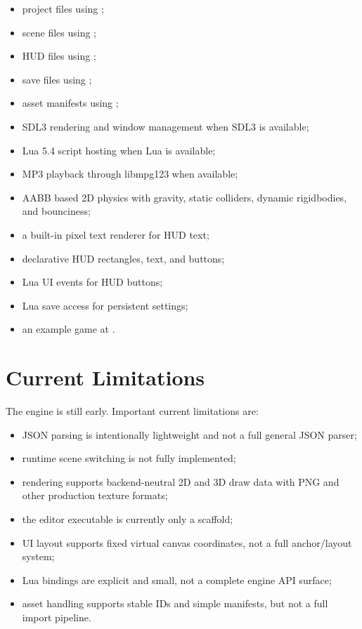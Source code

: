 \begin{itemize}
  \item project files using ;
  \item scene files using ;
  \item HUD files using ;
  \item save files using ;
  \item asset manifests using ;
  \item SDL3 rendering and window management when SDL3 is available;
  \item Lua 5.4 script hosting when Lua is available;
  \item MP3 playback through libmpg123 when available;
  \item AABB based 2D physics with gravity, static colliders, dynamic rigidbodies, and bounciness;
  \item a built-in pixel text renderer for HUD text;
  \item declarative HUD rectangles, text, and buttons;
  \item Lua UI events for HUD buttons;
  \item Lua save access for persistent settings;
  \item an example game at .
\end{itemize}

\section{Current Limitations}

The engine is still early. Important current limitations are:

\begin{itemize}
  \item JSON parsing is intentionally lightweight and not a full general JSON parser;
  \item runtime scene switching is not fully implemented;
  \item rendering supports backend-neutral 2D and 3D draw data with PNG and other production texture formats;
  \item the editor executable is currently only a scaffold;
  \item UI layout supports fixed virtual canvas coordinates, not a full anchor/layout system;
  \item Lua bindings are explicit and small, not a complete engine API surface;
  \item asset handling supports stable IDs and simple manifests, but not a full import pipeline.
\end{itemize}
